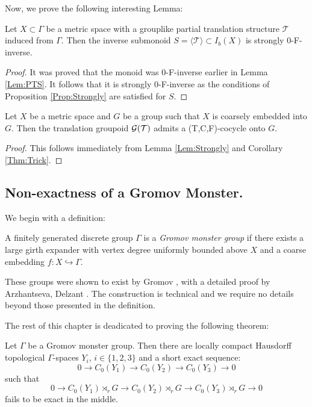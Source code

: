 \begin{example}
Now, we prove the following interesting Lemma:

\begin{lemma}\label{Lem:Strongly}
Let $X \subset \Gamma$ be a metric space with a grouplike partial translation structure $\mathcal{T}$ induced from $\Gamma$. Then the inverse submonoid $S=\langle \mathcal{T} \rangle \subset I_{b}(X)$ is strongly $0$-F-inverse.
\end{lemma}
\begin{proof}
It was proved that the monoid was $0$-F-inverse earlier in Lemma \ref{Lem:PTS}. It follows that it is strongly $0$-F-inverse as the conditions of Proposition \ref{Prop:Strongly} are satisfied for $S$.
\end{proof}

\begin{corollary}\label{Prop:Cocycle}
Let $X$ be a metric space and $G$ be a group such that $X$ is coarsely embedded into $G$. Then the translation groupoid $\mathcal{G}(\mathcal{T})$ admits a (T,C,F)-cocycle onto $G$.
\end{corollary}
\begin{proof}
This follows immediately from Lemma \ref{Lem:Strongly} and Corollary \ref{Thm:Trick}.
\end{proof}

\subsection{Non-exactness of a Gromov Monster.}
We begin with a definition:
\begin{definition}
A finitely generated discrete group $\Gamma$ is a \textit{Gromov monster group} if there exists a large girth expander with vertex degree uniformly bounded above $X$ and a coarse embedding $f: X \hookrightarrow \Gamma$. 
\end{definition}

These groups were shown to exist by Gromov \cite{MR1978492}, with a detailed proof by Arzhantseva, Delzant \cite{exrangrps}. The construction is technical and we require no details beyond those presented in the definition.

The rest of this chapter is deadicated to proving the following theorem:

\begin{thm}
Let $\Gamma$ be a Gromov monster group. Then there are locally compact Hausdorff topological $\Gamma$-spaces $Y_{i}$, $i \in \lbrace 1,2,3 \rbrace$ and a short exact sequence:
\begin{equation*}
0 \rightarrow C_{0}(Y_{1}) \rightarrow C_{0}(Y_{2}) \rightarrow C_{0}(Y_{3}) \rightarrow 0
\end{equation*}
such that
\begin{equation*}
0 \rightarrow C_{0}(Y_{1})\rtimes_{r} G \rightarrow C_{0}(Y_{2})\rtimes_{r} G \rightarrow C_{0}(Y_{3})\rtimes_{r} G \rightarrow 0
\end{equation*}
fails to be exact in the middle.
\end{thm}


\end{example}
